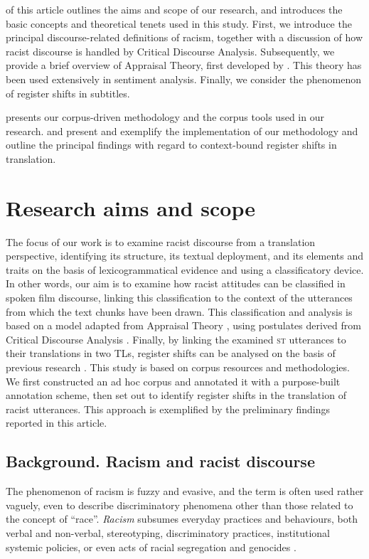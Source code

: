 \documentclass[output=paper]{LSP/langsci}
\begin{document}
 of this article outlines the aims and scope of our research, and introduces the basic concepts and theoretical tenets used in this study. First, we introduce the principal discourse-related definitions of racism, together with a discussion of how racist discourse is handled by Critical Discourse Analysis. Subsequently, we provide a brief overview of Appraisal Theory, first developed by \citet{MartinWhite2005}. This theory has been used extensively in sentiment analysis. Finally, we consider the phenomenon of register shifts in subtitles.

 presents our corpus-driven methodology and the corpus tools used in our research.  and  present and exemplify the implementation of our methodology and outline the principal findings with regard to context-bound register shifts in translation.

\section{Research aims and scope} \label{sec:2:2}
The focus of our work is to examine racist discourse from a translation perspective, identifying its structure, its textual deployment, and its elements and traits on the basis of lexicogrammatical evidence and using a classificatory device. In other words, our aim is to examine how racist attitudes can be classified in spoken film discourse, linking this classification to the context of the utterances from which the text chunks have been drawn. This classification and analysis is based on a model adapted from Appraisal Theory \citep{MartinWhite2005}, using postulates derived from Critical Discourse Analysis \citep{Reisigl2001,Dijk2000a,Dijk2000b,Dijk2002}. Finally, by linking the examined \textsc{st} utterances to their translations in two TLs, register shifts can be analysed on the basis of previous research \citep{Hatim1997, Mason2001, Pettit2005, Mubenga2009, Munday2012}.
This study is based on corpus resources and methodologies. We first constructed an ad hoc corpus and annotated it with a purpose-built annotation scheme, then set out to identify register shifts in the translation of racist utterances. This approach is exemplified by the preliminary findings reported in this article.

\subsection{Background. Racism and racist discourse} \label{sec:2:2:1}
The phenomenon of racism is fuzzy and evasive, and the term is often used rather vaguely, even to describe discriminatory phenomena other than those related to the concept of “race”. \textit{Racism} subsumes everyday practices and behaviours, both verbal and non-verbal, stereotyping, discriminatory practices, institutional systemic policies, or even acts of racial segregation and genocides \citep[637-653]{Giddens2009}.
\end{document}
